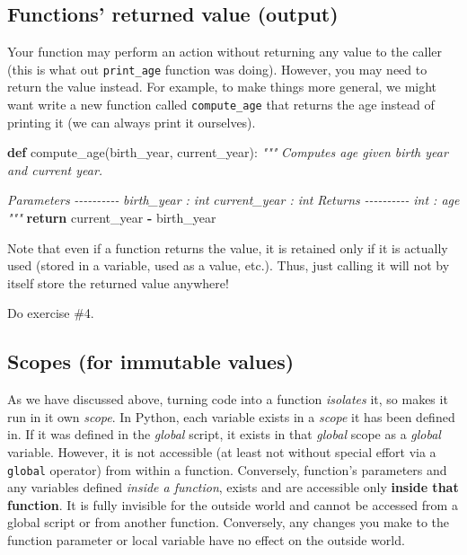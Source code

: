 \documentclass[
]{book}
\newenvironment{Shaded}{\begin{snugshade}}{\end{snugshade}}
\newcommand{\CommentTok}[1]{\textcolor[rgb]{0.56,0.35,0.01}{\textit{#1}}}
\newcommand{\ControlFlowTok}[1]{\textcolor[rgb]{0.13,0.29,0.53}{\textbf{#1}}}
\newcommand{\KeywordTok}[1]{\textcolor[rgb]{0.13,0.29,0.53}{\textbf{#1}}}
\newcommand{\NormalTok}[1]{#1}
\newcommand{\OperatorTok}[1]{\textcolor[rgb]{0.81,0.36,0.00}{\textbf{#1}}}
\begin{document}
\hypertarget{functions-returned-value-output}{%
\subsection{Functions' returned value (output)}\label{functions-returned-value-output}}

Your function may perform an action without returning any value to the caller (this is what out \texttt{print\_age} function was doing). However, you may need to return the value instead. For example, to make things more general, we might want write a new function called \texttt{compute\_age} that returns the age instead of printing it (we can always print it ourselves).

\begin{Shaded}
\begin{Highlighting}[]
\KeywordTok{def}\NormalTok{ compute\_age(birth\_year, current\_year):}
    \CommentTok{"""}
\CommentTok{    Computes age given birth year and current year.}

\CommentTok{    Parameters}
\CommentTok{    {-}{-}{-}{-}{-}{-}{-}{-}{-}{-}}
\CommentTok{    birth\_year : int}
\CommentTok{    current\_year : int}
\CommentTok{    }
\CommentTok{    Returns}
\CommentTok{    {-}{-}{-}{-}{-}{-}{-}{-}{-}{-}}
\CommentTok{    int : age}
\CommentTok{    """}
    \ControlFlowTok{return}\NormalTok{ current\_year }\OperatorTok{{-}}\NormalTok{ birth\_year}
\end{Highlighting}
\end{Shaded}

Note that even if a function returns the value, it is retained only if it is actually used (stored in a variable, used as a value, etc.). Thus, just calling it will not by itself store the returned value anywhere!

Do exercise \#4.

\hypertarget{scopes-for-immutable-values}{%
\subsection{Scopes (for immutable values)}\label{scopes-for-immutable-values}}

As we have discussed above, turning code into a function \emph{isolates} it, so makes it run in it own \emph{scope}. In Python, each variable exists in a \emph{scope} it has been defined in. If it was defined in the \emph{global} script, it exists in that \emph{global} scope as a \emph{global} variable. However, it is not accessible (at least not without special effort via a \texttt{global} operator) from within a function. Conversely, function's parameters and any variables defined \emph{inside a function}, exists and are accessible only \textbf{inside that function}. It is fully invisible for the outside world and cannot be accessed from a global script or from another function. Conversely, any changes you make to the function parameter or local variable have no effect on the outside world.
\end{document}
